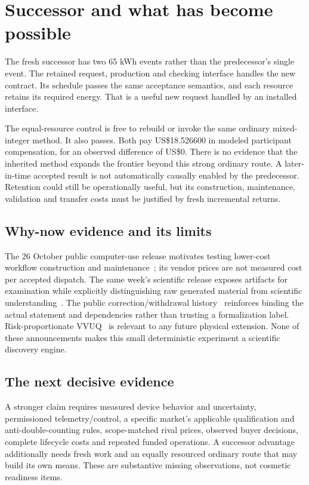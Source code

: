 \documentclass[10pt,a4paper]{article}
\begin{document}
\section{Successor and what has become possible}
The fresh successor has two 65 kWh events rather than the predecessor's single event. The retained request, production and checking interface handles the new contract. Its schedule passes the same acceptance semantics, and each resource retains its required energy. That is a useful new request handled by an installed interface.

The equal-resource control is free to rebuild or invoke the same ordinary mixed-integer method. It also passes. Both pay US\$18.526600 in modeled participant compensation, for an observed difference of US\$0. There is no evidence that the inherited method expands the frontier beyond this strong ordinary route. A later-in-time accepted result is not automatically causally enabled by the predecessor. Retention could still be operationally useful, but its construction, maintenance, validation and transfer costs must be justified by fresh incremental returns.

\SuccessorResults{}

\subsection{Why-now evidence and its limits}
The 26 October public computer-use release motivates testing lower-cost workflow construction and maintenance~\cite{terra2026}; its vendor prices are not measured cost per accepted dispatch. The same week's scientific release exposes artifacts for examination while explicitly distinguishing raw generated material from scientific understanding~\cite{science2026}. The public correction/withdrawal history~\cite{mathhistory2026} reinforces binding the actual statement and dependencies rather than trusting a formalization label. Risk-proportionate VVUQ~\cite{nist2026} is relevant to any future physical extension. None of these announcements makes this small deterministic experiment a scientific discovery engine.

\subsection{The next decisive evidence}
A stronger claim requires measured device behavior and uncertainty, permissioned telemetry/control, a specific market's applicable qualification and anti-double-counting rules, scope-matched rival prices, observed buyer decisions, complete lifecycle costs and repeated funded operations. A successor advantage additionally needs fresh work and an equally resourced ordinary route that may build its own means. These are substantive missing observations, not cosmetic readiness items.
\end{document}
